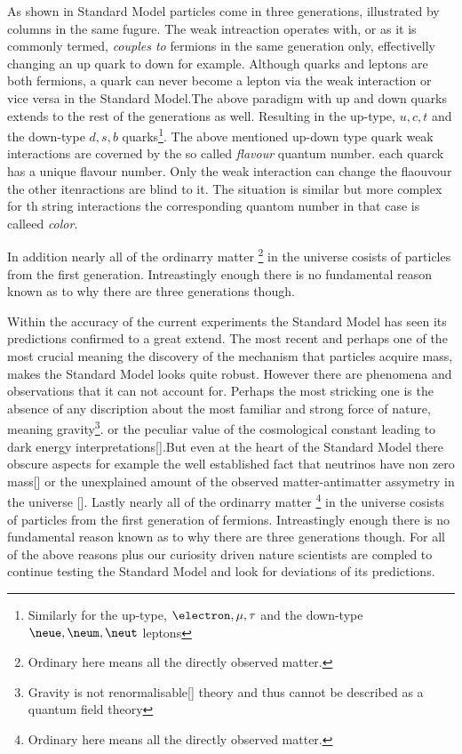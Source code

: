 As shown in  Standard Model particles come in three generations, illustrated by columns in the same fugure.
The weak intreaction operates with, or as it is commonly termed, {\it couples to} fermions in the same generation only, effectivelly
changing an up quark to down for example. Although quarks and leptons are both fermions, a quark can never become a lepton via
the weak interaction or vice versa in the Standard Model.The above paradigm with up and down quarks extends to the rest of the
generations as well. Resulting in the up-type, $u,c,t$ and the down-type $d,s,b$ quarks\footnote{Similarly for the  up-type, $\electron,\mu,\tau$
and the down-type $\neue,\neum,\neut$ leptons}. The above mentioned up-down type quark weak interactions are coverned by the
so called {\it flavour} quantum number. each quarck has a unique flavour number. Only the weak interaction can change the flaouvour
the other itenractions are blind to it. The situation is similar but more complex for th string interactions the corresponding
quantom number in that case is calleed {\it color}.

In addition nearly all of the ordinarry matter \footnote{Ordinary here means all the directly observed matter.} in the universe cosists of
particles from the first generation. Intreastingly enough there is no fundamental reason known as to why there are three generations though.


Within the accuracy of the current experiments the Standard Model has seen its predictions confirmed to a great extend.
The most recent and perhaps one of the most crucial meaning the discovery of the mechanism that particles acquire mass, makes the Standard
Model looks quite robust. However there are phenomena and observations that it can not account for. Perhaps the most stricking one is the
absence of any discription about the most familiar and strong force of nature, meaning gravity\footnote{Gravity is not renormalisable[\cite{}]
theory and thus cannot be described as a quantum field theory}. or the peculiar value of the cosmological constant leading to dark energy
interpretations[\cite{}].But even at the heart of the Standard Model there obscure aspects for example the well established fact that neutrinos
have non zero mass[\cite{}] or the unexplained amount of the observed matter-antimatter assymetry in the universe [\cite{}].
Lastly nearly all of the ordinarry matter \footnote{Ordinary here means all the directly observed matter.} in the universe cosists of
particles from the first generation of fermions. Intreastingly enough there is no fundamental reason known as to why there are three
generations though. For all of the above reasons plus our curiosity driven nature scientists are compled to continue testing the Standard Model
and look for deviations of its predictions.
